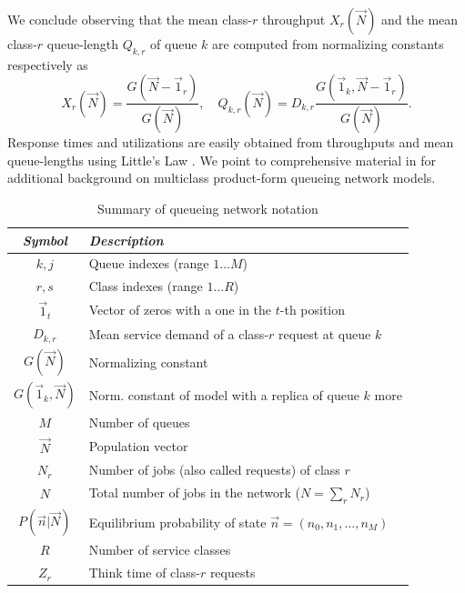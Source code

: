 \documentclass[journal,twocolumn,9.5pt]{IEEEtran}
\begin{document}
We conclude observing that the mean class-$r$ throughput $X_r(\vec N)$ and the mean class-$r$ queue-length $Q_{k,r}$ of queue $k$ are computed from normalizing constants respectively as \cite{ReiK75b}
\begin{equation}
\label{EQU:meanxq}
X_{r}(\vec N)=\frac{G(\vec N-\vec 1_r)}{G(\vec N)}, \quad Q_{k,r}(\vec N)=D_{k,r}\frac{G(\vec 1_k,\vec N-\vec 1_r)}{G(\vec N)}.
\end{equation}
Response times and utilizations are easily obtained from throughputs and mean queue-lengths using Little's Law \cite{LazZGS84}.
We point to comprehensive material in \cite{LazZGS84} for additional background on multiclass product-form queueing network models.
\begin{table}[ht!]
\renewcommand{\arraystretch}{1.05}
\centering
\caption{Summary of queueing network notation}
\begin{tabular}{|c|l|}
\hline
{\em Symbol} & {\em Description}\\
\hline
$k,j$ & Queue indexes (range $1\ldots M$) \\
$r,s$ & Class indexes  (range $1\ldots R$)\\
${\vec 1}_t$ & Vector of zeros with a one in the $t$-th position\\
$D_{k,r}$ & Mean service demand of a class-$r$ request at queue $k$\\
$G(\vec N)$ & Normalizing constant\\
$G(\vec 1_k,\vec N)$ & Norm. constant of model with a replica of queue $k$ more\\
$M$ & Number of queues\\
$\vec N$ & Population vector \\
$N_r$ & Number of jobs (also called requests) of class $r$\\
$N$ & Total number of jobs in the network ($N=\sum_r N_r$)\\
$P(\vec n|\vec N)$ & Equilibrium probability of state $\vec n=(n_0,n_1,\ldots,n_M)$\\
$R$ & Number of service classes \\
$Z_r$ & Think time of class-$r$ requests\\
\hline
\end{tabular}
\label{TAB:notation}
\end{table}
\end{document}
